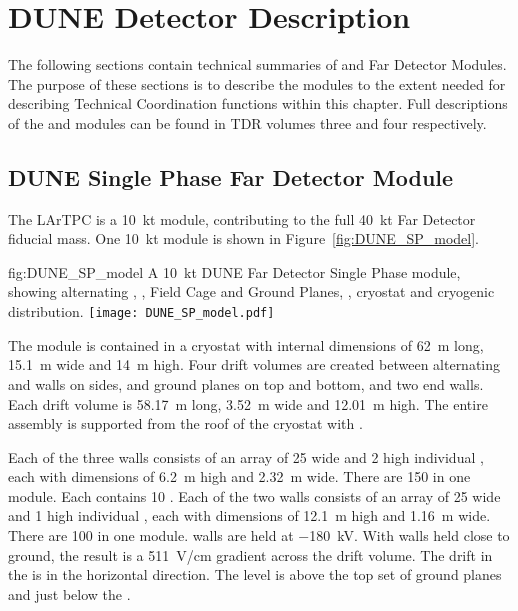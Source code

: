 \chapter{DUNE Detector Description}
\label{vl:tc-dune_overview}


The following sections contain technical summaries of 
 and  Far Detector Modules. The purpose of these
sections is to describe the modules to the extent needed for
describing Technical Coordination functions within this chapter. Full
descriptions of the  and  modules can be found
in TDR volumes three and four respectively.

\section{DUNE Single Phase Far Detector Module}
\label{sec:fdsp-SP-module}

The  LArTPC is a \SI{10}{\kilo\tonne} module,
contributing to the full \SI{40}{\kilo\tonne} Far Detector fiducial
mass.  One \SI{10}{\kilo\tonne}  module is shown in
Figure~\ref{fig:DUNE_SP_model}.
\begin{dunefigure}{fig:DUNE_SP_model} {A \SI{10}{\kilo\tonne} DUNE Far Detector
    Single Phase module, showing alternating ,
    , Field Cage and Ground Planes, , cryostat
    and cryogenic distribution.}
  \texttt{[image: DUNE\_SP\_model.pdf]}
\end{dunefigure} 

The module is contained in a cryostat with
internal dimensions of \SI{62}{\meter} long, \SI{15.1}{\meter} wide
and \SI{14}{\meter} high.  Four drift volumes are created between
alternating  and  walls on sides,  and
ground planes on top and bottom, and two end walls.  Each drift volume
is \SI{58.17}{\meter} long, \SI{3.52}{\meter} wide and
\SI{12.01}{\meter} high.  The entire assembly is supported from the
roof of the cryostat with .

Each of the three  walls consists of an array of \num{25}
wide and \num{2} high individual , each with dimensions
of \SI{6.2}{\meter} high and \SI{2.32}{\meter} wide. There are
\num{150}  in one module. Each  contains
\num{10} . Each of the two  walls consists of an
array of \num{25} wide and \num{1} high individual , each
with dimensions of \SI{12.1}{\meter} high and \SI{1.16}{\meter}
wide. There are \num{100}  in one module.  
walls are held at $-$\SI{180}{\kilo\volt}. With  walls held
close to ground, the result is a \SI{511}{\volt/\centi\meter} gradient
across the drift volume. The drift in the  is in the horizontal 
direction. The  level is above the top set of ground planes and just
below the .

